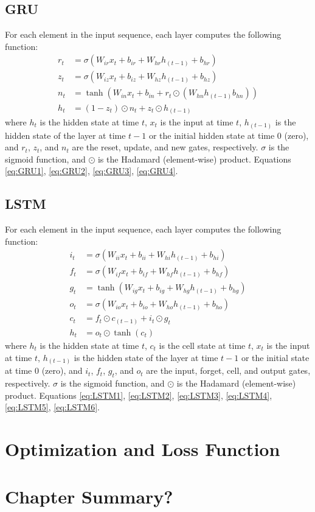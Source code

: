 \subsection{GRU}
For each element in the input sequence, each layer computes the following function:
\begin{align}
	r_{t} &= \sigma\left(W_{ir}x_{t} + b_{ir} + W_{hr}h_{\left(t-1\right)} + b_{hr}\right) \label{eq:GRU1} \\
	z_{t} &= \sigma\left(W_{iz}x_{t} + b_{iz} + W_{hz}h_{\left(t-1\right)} + b_{hz}\right) \label{eq:GRU2} \\
	n_{t} &= \tanh\left(W_{in}x_{t} + b_{in} + r_{t} \odot \left(W_{hn}h_{\left(t-1\right)} b_{hn}\right)\right) \label{eq:GRU3} \\
	h_{t} &= \left(1 - z_{t}\right) \odot n_{t} + z_{t} \odot h_{\left(t-1\right)} \label{eq:GRU4}
\end{align}
where $h_{t}$ is the hidden state at time $t$, $x_{t}$ is the input at time $t$, $h_{\left(t-1\right)}$ is the hidden state of the layer at time $t-1$ or the initial hidden state at time 0 (zero), and $r_{t}$, $z_{t}$, and $n_{t}$ are the reset, update, and new gates, respectively. $\sigma$ is the sigmoid function, and $\odot$ is the Hadamard (element-wise) product. Equations \ref{eq:GRU1}, \ref{eq:GRU2}, \ref{eq:GRU3}, \ref{eq:GRU4}.

\subsection{LSTM}
For each element in the input sequence, each layer computes the following function:
\begin{align}
	i_{t} &= \sigma\left(W_{ii}x_{t} + b_{ii} + W_{hi}h_{\left(t-1\right)} + b_{hi}\right) \label{eq:LSTM1} \\
	f_{t} &= \sigma\left(W_{if}x_{t} + b_{if} + W_{hf}h_{\left(t-1\right)} + b_{hf}\right) \label{eq:LSTM2} \\
	g_{t} &= \tanh\left(W_{ig}x_{t} + b_{ig} + W_{hg}h_{\left(t-1\right)} + b_{hg}\right) \label{eq:LSTM3} \\
	o_{t} &= \sigma\left(W_{io}x_{t} + b_{io} + W_{ho}h_{\left(t-1\right)} + b_{ho}\right) \label{eq:LSTM4} \\
	c_{t} &= f_{t} \odot c_{\left(t-1\right)} + i_{t} \odot g_{t} \label{eq:LSTM5} \\
	h_{t} &= o_{t} \odot \tanh\left(c_{t}\right) \label{eq:LSTM6}
\end{align}
where $h_{t}$ is the hidden state at time $t$, $c_{t}$ is the cell state at time $t$, $x_{t}$ is the input at time $t$, $h_{\left(t-1\right)}$ is the hidden state of the layer at time $t-1$ or the initial state at time 0 (zero), and $i_{t}$, $f_{t}$, $g_{t}$, and $o_{t}$ are the input, forget, cell, and output gates, respectively. $\sigma$ is the sigmoid function, and $\odot$ is the Hadamard (element-wise) product. Equations \ref{eq:LSTM1}, \ref{eq:LSTM2}, \ref{eq:LSTM3}, \ref{eq:LSTM4}, \ref{eq:LSTM5}, \ref{eq:LSTM6}.

\section{Optimization and Loss Function}

\section{Chapter Summary?}